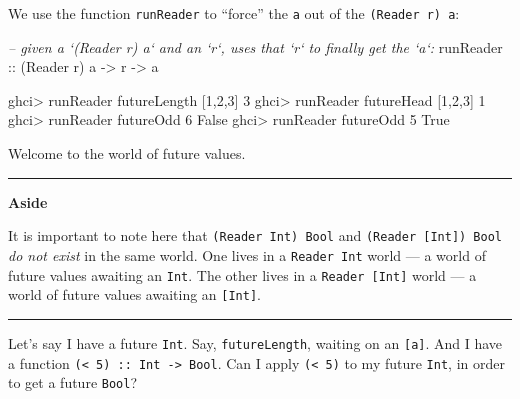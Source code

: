 \documentclass[]{article}
\newenvironment{Shaded}{}{}
\newcommand{\DataTypeTok}[1]{\textcolor[rgb]{0.56,0.13,0.00}{{#1}}}
\newcommand{\DecValTok}[1]{\textcolor[rgb]{0.25,0.63,0.44}{{#1}}}
\newcommand{\CommentTok}[1]{\textcolor[rgb]{0.38,0.63,0.69}{\textit{{#1}}}}
\newcommand{\OtherTok}[1]{\textcolor[rgb]{0.00,0.44,0.13}{{#1}}}
\newcommand{\FunctionTok}[1]{\textcolor[rgb]{0.02,0.16,0.49}{{#1}}}
\newcommand{\NormalTok}[1]{{#1}}
\begin{document}
We use the function \texttt{runReader} to ``force'' the \texttt{a} out
of the \texttt{(Reader\ r)\ a}:

\begin{Shaded}
\begin{Highlighting}[]
\CommentTok{-- given a `(Reader r) a` and an `r`, uses that `r` to finally get the `a`:}
\OtherTok{runReader ::} \NormalTok{(}\DataTypeTok{Reader} \NormalTok{r) a }\OtherTok{->} \NormalTok{r }\OtherTok{->} \NormalTok{a}
\end{Highlighting}
\end{Shaded}

\begin{Shaded}
\begin{Highlighting}[]
\NormalTok{ghci}\FunctionTok{>} \NormalTok{runReader futureLength [}\DecValTok{1}\NormalTok{,}\DecValTok{2}\NormalTok{,}\DecValTok{3}\NormalTok{]}
\DecValTok{3}
\NormalTok{ghci}\FunctionTok{>} \NormalTok{runReader futureHead [}\DecValTok{1}\NormalTok{,}\DecValTok{2}\NormalTok{,}\DecValTok{3}\NormalTok{]}
\DecValTok{1}
\NormalTok{ghci}\FunctionTok{>} \NormalTok{runReader futureOdd }\DecValTok{6}
\DataTypeTok{False}
\NormalTok{ghci}\FunctionTok{>} \NormalTok{runReader futureOdd }\DecValTok{5}
\DataTypeTok{True}
\end{Highlighting}
\end{Shaded}

Welcome to the world of future values.

\begin{center}\rule{0.5\linewidth}{\linethickness}\end{center}

\textbf{Aside}

It is important to note here that \texttt{(Reader\ Int)\ Bool} and
\texttt{(Reader\ {[}Int{]})\ Bool} \emph{do not exist} in the same
world. One lives in a \texttt{Reader\ Int} world --- a world of future
values awaiting an \texttt{Int}. The other lives in a
\texttt{Reader\ {[}Int{]}} world --- a world of future values awaiting
an \texttt{{[}Int{]}}.

\begin{center}\rule{0.5\linewidth}{\linethickness}\end{center}

Let's say I have a future \texttt{Int}. Say, \texttt{futureLength},
waiting on an \texttt{{[}a{]}}. And I have a function
\texttt{(\textless{}\ 5)\ ::\ Int\ -\textgreater{}\ Bool}. Can I apply
\texttt{(\textless{}\ 5)} to my future \texttt{Int}, in order to get a
future \texttt{Bool}?
\end{document}
